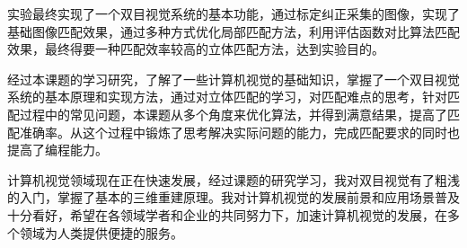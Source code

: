 实验最终实现了一个双目视觉系统的基本功能，通过标定纠正采集的图像，实现了基础图像匹配效果，通过多种方式优化局部匹配方法，利用评估函数对比算法匹配效果，最终得要一种匹配效率较高的立体匹配方法，达到实验目的。

经过本课题的学习研究，了解了一些计算机视觉的基础知识，掌握了一个双目视觉系统的基本原理和实现方法，通过对立体匹配的学习，对匹配难点的思考，针对匹配过程中的常见问题，本课题从多个角度来优化算法，并得到满意结果，提高了匹配准确率。从这个过程中锻炼了思考解决实际问题的能力，完成匹配要求的同时也提高了编程能力。

计算机视觉领域现在正在快速发展，经过课题的研究学习，我对双目视觉有了粗浅的入门，掌握了基本的三维重建原理。我对计算机视觉的发展前景和应用场景普及十分看好，希望在各领域学者和企业的共同努力下，加速计算机视觉的发展，在多个领域为人类提供便捷的服务。
